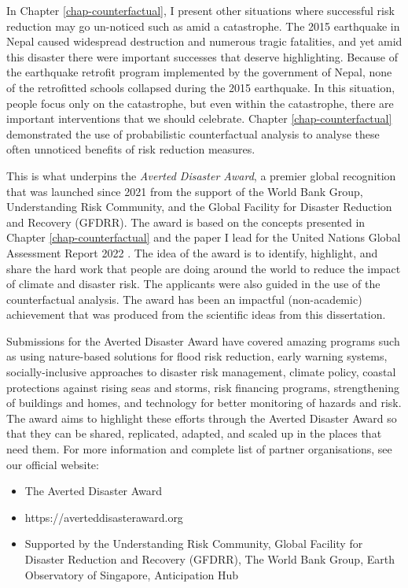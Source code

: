 In Chapter \ref{chap-counterfactual}, I present other situations where successful risk reduction may go un-noticed such as amid a catastrophe. The 2015 earthquake in Nepal caused widespread destruction and numerous tragic fatalities, and yet amid this disaster there were important successes that deserve highlighting. Because of the earthquake retrofit program implemented by the government of Nepal, none of the retrofitted schools collapsed during the 2015 earthquake. In this situation, people focus only on the catastrophe, but even within the catastrophe, there are important interventions that we should celebrate. Chapter \ref{chap-counterfactual} demonstrated the use of probabilistic counterfactual analysis to analyse these often unnoticed benefits of risk reduction measures.

This is what underpins the \textit{Averted Disaster Award}, a premier global recognition that was launched since 2021 from the support of the World Bank Group, Understanding Risk Community, and the Global Facility for Disaster Reduction and Recovery (GFDRR). The award is based on the concepts presented in Chapter \ref{chap-counterfactual} and the paper I lead for the United Nations Global Assessment Report 2022 \citep{lallemant_rabonza_gar_2022}. The idea of the award is to identify, highlight, and share the hard work that people are doing around the world to reduce the impact of climate and disaster risk. The applicants were also guided in the use of the counterfactual analysis. The award has been an impactful (non-academic) achievement that was produced from the scientific ideas from this dissertation.

Submissions for the Averted Disaster Award have covered amazing programs such as using nature-based solutions for flood risk reduction, early warning systems, socially-inclusive approaches to disaster risk management, climate policy, coastal protections against rising seas and storms, risk financing programs, strengthening of buildings and homes, and technology for better monitoring of hazards and risk. The award aims to highlight these efforts through the Averted Disaster Award so that they can be shared, replicated, adapted, and scaled up in the places that need them. For more information and complete list of partner organisations, see our official website: 
\begin{itemize}
\setlength\itemsep{-0.45em}
    \item The Averted Disaster Award
    \item https://averteddisasteraward.org
    \item Supported by the Understanding Risk Community, Global Facility for Disaster Reduction and Recovery (GFDRR), The World Bank Group, Earth Observatory of Singapore, Anticipation Hub
\end{itemize}



